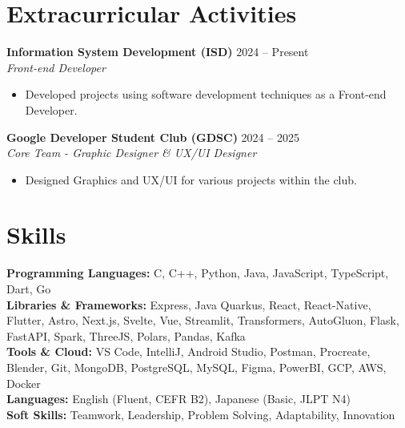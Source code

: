 \documentclass[a4paper,10pt]{article}
\newcommand{\entry}[4]{
  \vspace{1.2ex}
  \textbf{#1} \hfill #2 \\
  \textit{#3} \hfill \textit{#4} \par
}
\begin{document}
\section*{Extracurricular Activities}

\entry{Information System Development (ISD)}{2024 -- Present}{Front-end Developer}{}
\begin{itemize}
    \item Developed projects using software development techniques as a Front-end Developer.
\end{itemize}

\entry{Google Developer Student Club (GDSC)}{2024 -- 2025}{Core Team - Graphic Designer \& UX/UI Designer}{}
\begin{itemize}
    \item Designed Graphics and UX/UI for various projects within the club.
\end{itemize}

\section*{Skills}
\textbf{Programming Languages:} C, C++, Python, Java, JavaScript, TypeScript, Dart, Go \\
\textbf{Libraries \& Frameworks:} Express, Java Quarkus, React, React-Native, Flutter, Astro, Next.js, Svelte, Vue, Streamlit, Transformers, AutoGluon, Flask, FastAPI, Spark, ThreeJS, Polars, Pandas, Kafka \\
\textbf{Tools \& Cloud:} VS Code, IntelliJ, Android Studio, Postman, Procreate, Blender, Git, MongoDB, PostgreSQL, MySQL, Figma, PowerBI, GCP, AWS, Docker \\
\textbf{Languages:} English (Fluent, CEFR B2), Japanese (Basic, JLPT N4) \\
\textbf{Soft Skills:} Teamwork, Leadership, Problem Solving, Adaptability, Innovation
\end{document}

